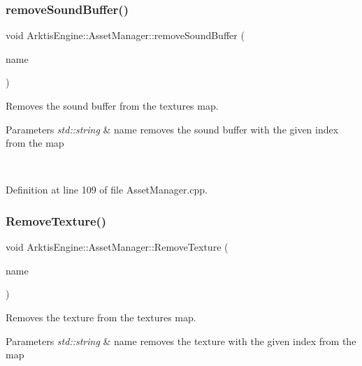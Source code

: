 \subsubsection{\texorpdfstring{removeSoundBuffer()}{removeSoundBuffer()}}
{\footnotesize\ttfamily void Arktis\+Engine\+::\+Asset\+Manager\+::remove\+Sound\+Buffer (\begin{DoxyParamCaption}\item[{std\+::string}]{name }\end{DoxyParamCaption})}



Removes the sound buffer from the textures map. 


\begin{DoxyParams}{Parameters}
{\em std\+::string} & name removes the sound buffer with the given index from the map \begin{DoxyVerb}\end{DoxyVerb}
 \\
\hline
\end{DoxyParams}


Definition at line 109 of file Asset\+Manager.\+cpp.


\begin{DoxyCode}{0}

\end{DoxyCode}
\mbox{\label{class_arktis_engine_1_1_asset_manager_a91c15c5726d420f3516a8ac4c2cba6d8}} 
\subsubsection{\texorpdfstring{RemoveTexture()}{RemoveTexture()}}
{\footnotesize\ttfamily void Arktis\+Engine\+::\+Asset\+Manager\+::\+Remove\+Texture (\begin{DoxyParamCaption}\item[{std\+::string}]{name }\end{DoxyParamCaption})}



Removes the texture from the textures map. 


\begin{DoxyParams}{Parameters}
{\em std\+::string} & name removes the texture with the given index from the map \begin{DoxyVerb}\end{DoxyVerb}
 \\
\hline
\end{DoxyParams}


